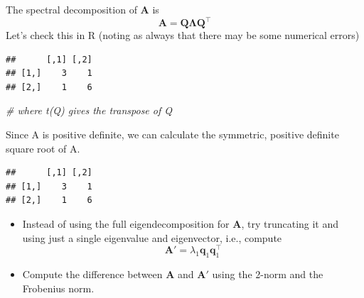 \documentclass[]{book}
\newenvironment{Shaded}{\begin{snugshade}}{\end{snugshade}}
\newcommand{\CommentTok}[1]{\textcolor[rgb]{0.56,0.35,0.01}{\textit{#1}}}
\newcommand{\FloatTok}[1]{\textcolor[rgb]{0.00,0.00,0.81}{#1}}
\newcommand{\KeywordTok}[1]{\textcolor[rgb]{0.13,0.29,0.53}{\textbf{#1}}}
\newcommand{\NormalTok}[1]{#1}
\newcommand{\OperatorTok}[1]{\textcolor[rgb]{0.81,0.36,0.00}{\textbf{#1}}}
\providecommand{\tightlist}{%
  \setlength{\itemsep}{0pt}\setlength{\parskip}{0pt}}
\theoremstyle{definition}
\theoremstyle{definition}
\theoremstyle{definition}
\theoremstyle{remark}
\begin{document}
The spectral decomposition of \(\mathbf A\) is
\[\mathbf A= \mathbf Q\boldsymbol \Lambda\mathbf Q^\top\]
Let's check this in R (noting as always that there may be some numerical errors)

\begin{Shaded}
\end{Shaded}

\begin{verbatim}
##      [,1] [,2]
## [1,]    3    1
## [2,]    1    6
\end{verbatim}

\begin{Shaded}
\begin{Highlighting}[]
                                   \CommentTok{# where t(Q) gives the transpose of Q}
\end{Highlighting}
\end{Shaded}

Since A is positive definite, we can calculate the symmetric, positive definite square root of A.

\begin{Shaded}
\end{Shaded}

\begin{verbatim}
##      [,1] [,2]
## [1,]    3    1
## [2,]    1    6
\end{verbatim}

\begin{itemize}
\tightlist
\item
  Instead of using the full eigendecomposition for \(\mathbf A\), try truncating it and using just a single eigenvalue and eigenvector, i.e., compute
  \[\mathbf A' = \lambda_1 \mathbf q_1 \mathbf q_1^\top\]
\item
  Compute the difference between \(\mathbf A\) and \(\mathbf A'\) using the 2-norm and the Frobenius norm.
\end{itemize}
\end{document}
